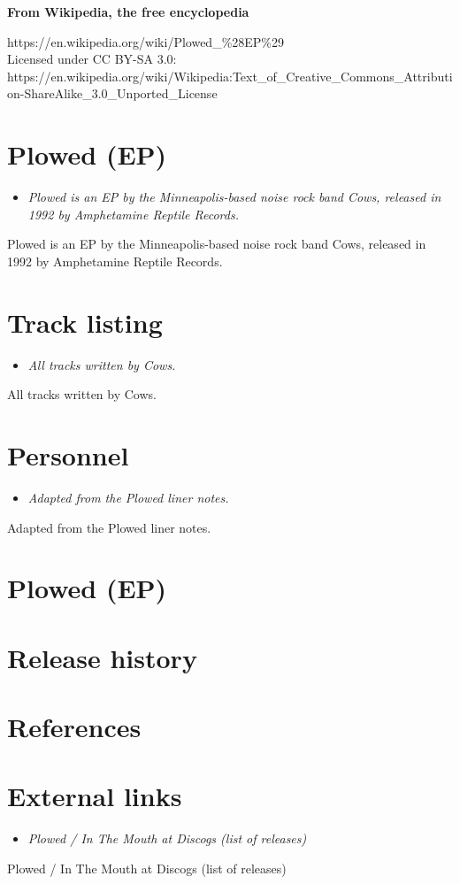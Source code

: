 \textbf{From Wikipedia, the free encyclopedia}

https://en.wikipedia.org/wiki/Plowed\_\%28EP\%29\\
Licensed under CC BY-SA 3.0:\\
https://en.wikipedia.org/wiki/Wikipedia:Text\_of\_Creative\_Commons\_Attribution-ShareAlike\_3.0\_Unported\_License

\section{Plowed (EP)}\label{plowed-ep}

\begin{itemize}
\item
  \emph{Plowed is an EP by the Minneapolis-based noise rock band Cows,
  released in 1992 by Amphetamine Reptile Records.}
\end{itemize}

Plowed is an EP by the Minneapolis-based noise rock band Cows, released
in 1992 by Amphetamine Reptile Records.

\section{Track listing}\label{track-listing}

\begin{itemize}
\item
  \emph{All tracks written by Cows.}
\end{itemize}

All tracks written by Cows.

\section{Personnel}\label{personnel}

\begin{itemize}
\item
  \emph{Adapted from the Plowed liner notes.}
\end{itemize}

Adapted from the Plowed liner notes.

\section{Plowed (EP)}\label{plowed-ep-1}

\section{Release history}\label{release-history}

\section{References}\label{references}

\section{External links}\label{external-links}

\begin{itemize}
\item
  \emph{Plowed / In The Mouth at Discogs (list of releases)}
\end{itemize}

Plowed / In The Mouth at Discogs (list of releases)
